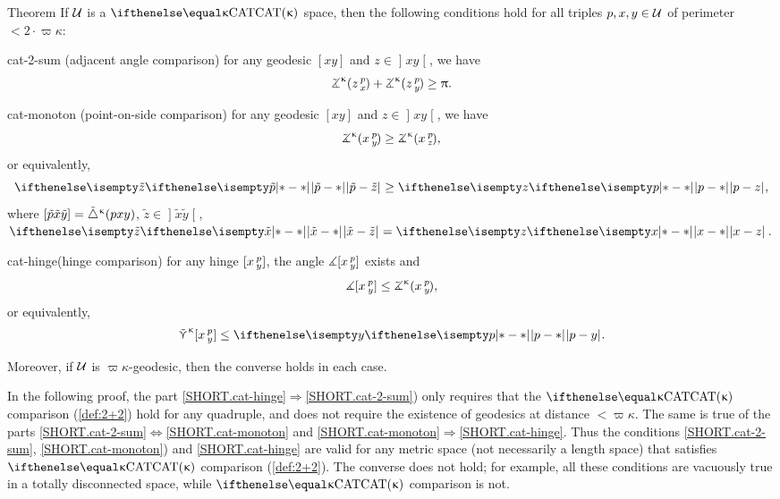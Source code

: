 \begin{thm}{Theorem}
\label{thm:defs_of_cat} 
If $\mathcal{U}$ is a $\CAT\kappa$ space, then 
the following conditions hold for all triples $p,x,y\in \spc{U}$ of perimeter $<2\cdot\varpi\kappa$:

\begin{subthm}{cat-2-sum} (adjacent angle comparison) for any geodesic $[x y]$ and $z\in \mathopen{]}x y\mathclose{[}$, we have
\[\angk\kappa z p x
+\angk\kappa z p y\ge \pi.\]
\end{subthm}

\begin{subthm}{cat-monoton}
(point-on-side comparison) 
for any geodesic $[x y]$ and $z\in \mathopen{]}x y\mathclose{[}$, we have
\[\angk\kappa x p y\ge\angk\kappa x p z,\]
or equivalently, 
\[\dist{\tilde p}{\tilde z}{}\ge \dist{p}{z}{},\]
where $[{\tilde p}{\tilde x}{\tilde y}]={\tilde\triangle}^{\upkappa}(p x y)$, $\tilde z\in\mathopen{]} \tilde x\tilde y\mathclose{[}$, $\dist{\tilde x}{\tilde z}{}=\dist{x}{z}{}$.
\end{subthm}

\begin{subthm}{cat-hinge}(hinge comparison)
for any hinge $[x\,{}^{p}_{y}]$, the angle 
$\measuredangle[x\,{}^{p}_{y}]$ exists and
\[\mangle\hinge x p y\le\angk\kappa x p y,\]
or equivalently,
\[\side\kappa \hinge x p y\le\dist{p}{y}{}.\]
\end{subthm}

Moreover, if  $\mathcal{U}$ is  $\varpi\kappa$-geodesic, then the converse holds in each case.  

\end{thm}


\label{22remark}
In the following proof, the part \ref{SHORT.cat-hinge}$\Rightarrow$\ref{SHORT.cat-2-sum})
only requires that the $\CAT\kappa$ comparison (\ref{def:2+2}) hold for any quadruple, and does not require the existence of geodesics at distance $<\varpi\kappa$. 
The same is true of the parts \ref{SHORT.cat-2-sum}$\Leftrightarrow$\ref{SHORT.cat-monoton} and
\ref{SHORT.cat-monoton}$\Rightarrow$\ref{SHORT.cat-hinge}.  
Thus the conditions \ref{SHORT.cat-2-sum}, \ref{SHORT.cat-monoton}) and \ref{SHORT.cat-hinge} are valid for any metric space (not necessarily a length space) that satisfies $\CAT\kappa$ comparison (\ref{def:2+2}). 
The converse does not hold; for example, all these conditions are 
vacuously true in a 
totally disconnected space, while 
$\CAT\kappa$ comparison is not.

